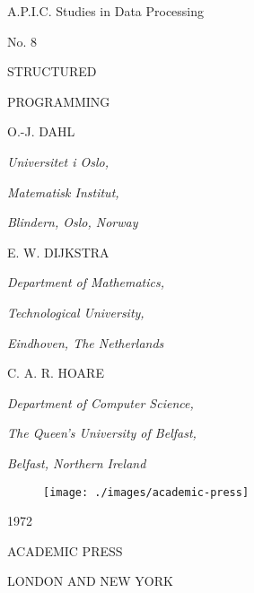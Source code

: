 \pagestyle{empty}

\begin{center}
\large
A.P.I.C. Studies in Data Processing

No. 8
\vfill

{
	\Huge
	STRUCTURED
	\smallskip
	
	PROGRAMMING
}
\vfill

\small
O.-J. DAHL

\emph{Universitet i Oslo,}

\emph{Matematisk Institut,}

\emph{Blindern, Oslo, Norway}
\vspace{2em}

E. W. DIJKSTRA

\emph{Department of Mathematics,}

\emph{Technological University,}

\emph{Eindhoven, The Netherlands}
\vspace{2em}

C. A. R. HOARE

\emph{Department of Computer Science,}

\emph{The Queen's University of Belfast,}

\emph{Belfast, Northern Ireland}

\normalsize

\vfill
\begin{figure}[htpb]
	\centering
	\texttt{[image: ./images/academic-press]}
\end{figure}
\vspace{-.5em}

1972

ACADEMIC PRESS

LONDON AND NEW YORK
\end{center}

\newpage

